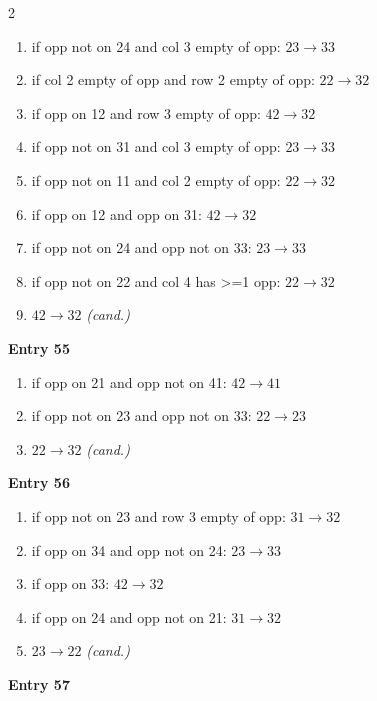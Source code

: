 \begin{multicols}{2}
\begin{tikzpicture}[scale=0.24]
\end{tikzpicture}
\nopagebreak\begin{enumerate}[topsep=1pt,itemsep=0pt,parsep=0pt,leftmargin=2.2em,label=\arabic*.]
\item if opp not on 24 and col 3 empty of opp: $23\!\to\!33$
\item if col 2 empty of opp and row 2 empty of opp: $22\!\to\!32$
\item if opp on 12 and row 3 empty of opp: $42\!\to\!32$
\item if opp not on 31 and col 3 empty of opp: $23\!\to\!33$
\item if opp not on 11 and col 2 empty of opp: $22\!\to\!32$
\item if opp on 12 and opp on 31: $42\!\to\!32$
\item if opp not on 24 and opp not on 33: $23\!\to\!33$
\item if opp not on 22 and col 4 has >=1 opp: $22\!\to\!32$
\item $42\!\to\!32$ \hfill\textit{(cand.)}
\end{enumerate}\smallskip
\noindent\textbf{Entry 55} \; 
\nopagebreak\begin{enumerate}[topsep=1pt,itemsep=0pt,parsep=0pt,leftmargin=2.2em,label=\arabic*.]
\item if opp on 21 and opp not on 41: $42\!\to\!41$
\item if opp not on 23 and opp not on 33: $22\!\to\!23$
\item $22\!\to\!32$ \hfill\textit{(cand.)}
\end{enumerate}\smallskip
\noindent\textbf{Entry 56} \; 
\nopagebreak\begin{enumerate}[topsep=1pt,itemsep=0pt,parsep=0pt,leftmargin=2.2em,label=\arabic*.]
\item if opp not on 23 and row 3 empty of opp: $31\!\to\!32$
\item if opp on 34 and opp not on 24: $23\!\to\!33$
\item if opp on 33: $42\!\to\!32$
\item if opp on 24 and opp not on 21: $31\!\to\!32$
\item $23\!\to\!22$ \hfill\textit{(cand.)}
\end{enumerate}\smallskip
\noindent\textbf{Entry 57} \; 
\end{multicols}
